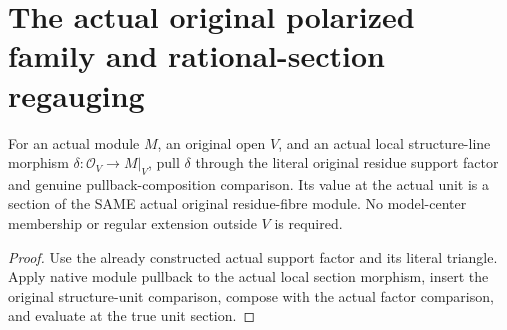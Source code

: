 \section{The actual original polarized family and rational-section regauging}

\begin{definition}
\label{def:intrinsic-numerical-actual-support-local-line-section}
\leanok
{}
For an actual module $M$, an original open $V$, and an actual local
structure-line morphism $\delta:\mathcal O_V\to M|_V$, pull $\delta$
through the literal original residue support factor and genuine
pullback-composition comparison. Its value at the actual unit is a
section of the SAME actual original residue-fibre module. No model-center
membership or regular extension outside $V$ is required.
\end{definition}
\begin{proof}
Use the already constructed actual support factor and its literal triangle.
Apply native module pullback to the actual local section morphism, insert
the original structure-unit comparison, compose with the actual factor
comparison, and evaluate at the true unit section.
\end{proof}

